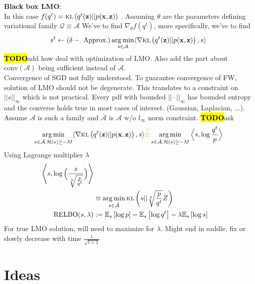 \documentclass[letterpaper]{article}
\newcommand{\TODO}{\hl{\textbf{TODO}}}
\newcommand{\comment}[1]{\textcolor{OliveGreen}{#1}}
\newcommand{\orange}[1]{\textcolor{BurntOrange}{#1}}
\DeclareMathOperator*{\argmin}{arg\,min}
\newcommand{\bx}{\mathbf{x}}
\newcommand{\bz}{\mathbf{z}}
\newcommand{\EEE}[2]{\mathbb{E}_{#1}\left[#2\right]}
\newcommand{\grad}{\nabla}
\newcommand{\gradd}[1]{\nabla_{#1}}
\newcommand{\kl}[1]{\textsc{kl}\left(#1\right)}
\begin{document}
  {\bf Black box LMO}: \\
  \comment{In this case $f(q^t) = \kl{q^t(\bz) || p(\bx, \bz)}$ }. Assuming 
  $\theta$ are the parameters defining variational family $\mathcal{Q} \equiv \mathcal{A}$
  We've to find $\gradd{\theta}f(q^t)$, more specifically, we've to find 
  $$
  s^t \gets (\delta-\text{ Approx.}) \argmin\limits_{s \in \mathcal{A}}\langle 
    \grad \kl{q^t(\bz) || p(\bx, \bz)}, s \rangle
  $$
  \TODO add how \cite{guo2016boosting} \cite{locatello2017boosting} deal with optimization of LMO. Also
  add the part about $\text{conv}(\mathcal{A})$ being sufficient instead of $\mathcal{A}$.\\
  Convergence of SGD not fully understood. To guarantee convergence of FW, solution of LMO should 
  not be degenerate. This translates to a constraint on $||s||_{\infty}$ which is not practical.
  Every pdf with bounded $||\cdot||_{\infty}$ has bounded entropy and the converse holds true in 
  most cases of interest. \comment{(Gaussian, Laplacian, ...)}. Assume $\mathcal{A}$ is such a family
  and $\bar{\mathcal{A}}$ is $\mathcal{A}$ w/o $l_{\infty}$ norm constraint.  \TODO ask
  $$
  \argmin\limits_{s \in \bar{\mathcal{A}}, \mathcal{H}(s) \geq -M}\langle \grad 
  \kl{q^t(\bz) || p(\bx, \bz)},
  s \rangle \orange{\overset{?}{\equiv}}
    \argmin\limits_{s \in \bar{\mathcal{A}}, \mathcal{H}(s) \geq -M}\Big\langle s, 
    \log \frac{q^t}{p} \Big\rangle
  $$
  Using Lagrange multiplier $\lambda$
  \begin{align}
    \Bigg\langle s, \log \Big(\frac{s}{\sqrt[\lambda]{\frac{p}{q^t}}} \Big)\Bigg\rangle \nonumber\\
      &\equiv \argmin\limits_{s \in \bar{\mathcal{A}}}\kl{s||{\sqrt[\lambda]{\frac{p}{q^t}}} Z} \nonumber\\
    \text{RELBO}(s, \lambda) &:= \EEE{s}{\log p} - \EEE{s}{\log q^t} - \lambda\EEE{s}{\log s}
  \end{align}
  For true LMO solution, will need to maximize for $\lambda$. Might end in saddle, fix or slowly decrease
  with time $\frac{1}{\sqrt{t + 1}}$

  \section{Ideas}
\end{document}
